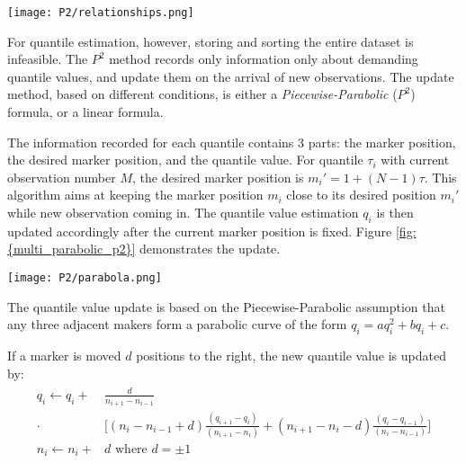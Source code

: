 \begin{figure*}[h!]
	\texttt{[image: P2/relationships.png]}
    \caption{Relationship between $\tau$ value, marker position and quantile values correspondingly for 3 adjacent quantiles}
    \label{fig: {multi_relationship_p2}}
\end{figure*}

For quantile estimation, however, storing and sorting the entire dataset is infeasible. The $P^2$ method records only information only about demanding quantile values, and update them on the arrival of new observations. The update method, based on different conditions, is either a \textit{Piecewise-Parabolic} ($P^2$) formula, or a linear formula.

The information recorded for each quantile contains 3 parts: the marker position, the desired marker position, and the quantile value. For quantile $\tau_i$ with current observation number $M$, the desired marker position is $m_i \prime = 1 + (N-1)\tau$. This algorithm aims at keeping the marker position $m_i$ close to its desired position $m_i \prime$ while new observation coming in. The quantile value estimation $q_i$ is then updated accordingly after the current marker position is fixed. Figure \ref{fig: {multi_parabolic_p2}} demonstrates the update.

\begin{figure*}[h!]
	\texttt{[image: P2/parabola.png]}
    \caption{Quantile value update using the Piecewise-Parabolic($P^2$) formula}
    \label{fig: {multi_parabolic_p2}}
\end{figure*}

The quantile value update is based on the Piecewise-Parabolic assumption that any three adjacent makers form a parabolic curve of the form $q_i = aq_i^2 + bq_i + c$.

If a marker is moved $d$ positions to the right, the new quantile value is updated by:
\begin{align}
\begin{split}
    q_{i} \leftarrow q_{i}+ & \frac{d}{n_{i+1}-n_{i-1}}\\
    \cdot & { \bigg[ 
        \left(n_{i}-n_{i-1}+d\right) \frac{\left(q_{i+1}-q_{i}\right)}{\left(n_{i+1}-n_{i}\right)}
        +\left(n_{i+1}-n_{i}-d\right) \frac{\left(q_{i}-q_{i-1}\right)}{\left(n_{i}-n_{i-1}\right)}
        } \bigg] \\
    n_{i} \leftarrow n_{i}+&d \text{ where } d = \pm 1
\end{split}
\end{align}

